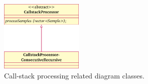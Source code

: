 \begin{figure}
  \centering
  \includegraphics[width=0.35\textwidth]{figures/user-guide/tool-design-interpolate-callstack-processor.pdf}
  \caption{Call-stack processing related diagram classes.}
  \label{fig:tool_design_interpolate_callstackprocessor}
\end{figure}
